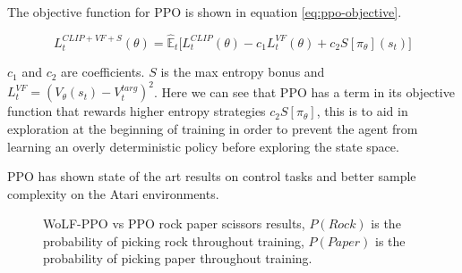 \documentclass[conference]{IEEEtran}
\begin{document}
The objective function for PPO is shown in equation \ref{eq:ppo-objective}.

\begin{equation}
    L_t^{CLIP+VF+S}(\theta) = \hat{\mathbb{E}}_t\big[L_t^{CLIP}(\theta)-c_1L_t^{VF}(\theta)+c_2S[\pi_{\theta}](s_t)\big]
    \label{eq:ppo-objective}
\end{equation}

$c_1$ and $c_2$ are coefficients. $S$ is the max entropy bonus and $L_t^{VF} = (V_{\theta}(s_t)-V_t^{targ})^2$. Here we can see that PPO has a term in its objective function that rewards higher entropy strategies $c_2S[\pi_{\theta}]$, this is to aid in exploration at the beginning of training in order to prevent the agent from learning an overly deterministic policy before exploring the state space. 

PPO has shown state of the art results on control tasks and better sample complexity on the Atari environments.

\begin{figure}[htbp]
    \caption{WoLF-PPO vs PPO rock paper scissors results, $P(Rock)$ is the probability of picking rock throughout training, $P(Paper)$ is the probability of picking paper throughout training.}
\end{figure}
\end{document}
